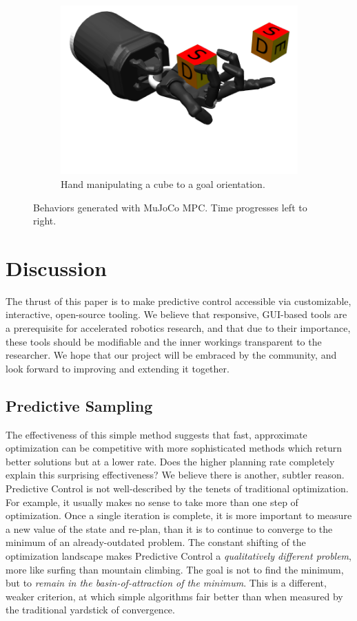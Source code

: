 \begin{figure}[H]
\begin{subfigure}{0.98\textwidth}
		\includegraphics[width=.225\textwidth]{predictive_sampling/hand_4.png}%
		\caption{Hand manipulating a cube to a goal orientation.}
		\label{ps_hand}
	\end{subfigure}
	\caption[Behaviors generated with MuJoCo MPC]{Behaviors generated with MuJoCo MPC. Time progresses left to right.}
	\label{ps_examples}
\end{figure}

\section{Discussion} \label{ps_discussion}
The thrust of this paper is to make predictive control accessible via customizable, interactive, open-source tooling. We believe that responsive, GUI-based tools are a prerequisite for accelerated robotics research, and that due to their importance, these tools should be modifiable and the inner workings transparent to the researcher. We hope that our \app{} project will be embraced by the community, and look forward to improving and extending it together.

\subsection{Predictive Sampling}
The effectiveness of this simple method suggests that fast, approximate optimization can be competitive with more sophisticated methods which return better solutions but at a lower rate. Does the higher planning rate completely explain this surprising effectiveness? We believe there is another, subtler reason. Predictive Control is not well-described by the tenets of traditional optimization. For example, it usually makes no sense to take more than one step of optimization. Once a single iteration is complete, it is more important to measure a new value of the state and re-plan, than it is to continue to converge to the minimum of an already-outdated problem. The constant shifting of the optimization landscape makes Predictive Control a \emph{qualitatively different problem}, more like surfing than mountain climbing. The goal is not to find the minimum, but to \emph{remain in the basin-of-attraction of the minimum}. This is a different, weaker criterion, at which simple algorithms fair better than when measured by the traditional yardstick of convergence.

